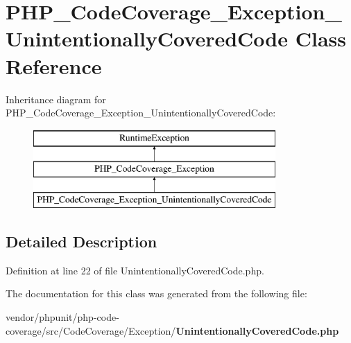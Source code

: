 \section{P\+H\+P\+\_\+\+Code\+Coverage\+\_\+\+Exception\+\_\+\+Unintentionally\+Covered\+Code Class Reference}
\label{class_p_h_p___code_coverage___exception___unintentionally_covered_code}
Inheritance diagram for P\+H\+P\+\_\+\+Code\+Coverage\+\_\+\+Exception\+\_\+\+Unintentionally\+Covered\+Code\+:\begin{figure}[H]
\begin{center}
\leavevmode
\includegraphics[height=3.000000cm]{class_p_h_p___code_coverage___exception___unintentionally_covered_code}
\end{center}
\end{figure}


\subsection{Detailed Description}


Definition at line 22 of file Unintentionally\+Covered\+Code.\+php.



The documentation for this class was generated from the following file\+:\begin{DoxyCompactItemize}
\item 
vendor/phpunit/php-\/code-\/coverage/src/\+Code\+Coverage/\+Exception/{\bf Unintentionally\+Covered\+Code.\+php}\end{DoxyCompactItemize}
